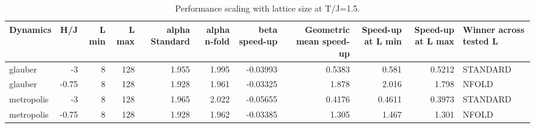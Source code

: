 \begin{table}
\caption{Performance scaling with lattice size at T/J=1.5.}
\label{tab:size_performance}
\begin{tabular}{lrrrrrrrrrl}
\toprule
Dynamics & H/J & L min & L max & alpha Standard & alpha n-fold & beta speed-up & Geometric mean speed-up & Speed-up at L min & Speed-up at L max & Winner across tested L \\
\midrule
glauber & -3 & 8 & 128 & 1.955 & 1.995 & -0.03993 & 0.5383 & 0.581 & 0.5212 & STANDARD \\
glauber & -0.75 & 8 & 128 & 1.928 & 1.961 & -0.03325 & 1.878 & 2.016 & 1.798 & NFOLD \\
metropolis & -3 & 8 & 128 & 1.965 & 2.022 & -0.05655 & 0.4176 & 0.4611 & 0.3973 & STANDARD \\
metropolis & -0.75 & 8 & 128 & 1.928 & 1.962 & -0.03385 & 1.305 & 1.467 & 1.301 & NFOLD \\
\bottomrule
\end{tabular}
\end{table}
